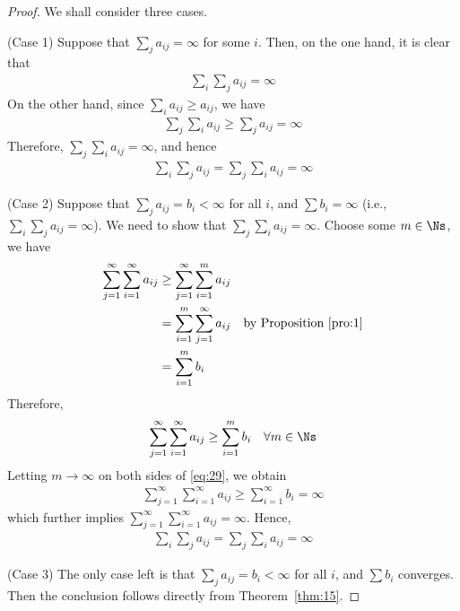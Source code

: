\documentclass[thmcnt=section, 12pt]{elegantbook}
\begin{document}
\begin{proof}
    We shall consider three cases.

    \par (Case 1) Suppose that $\sum_{j} a_{ij} = \infty$ for some $i$. Then, on the one hand, it is clear that 
    \begin{align*}
        \sum_{i} \sum_{j} a_{ij} = \infty
    \end{align*}
    On the other hand, since $\sum_{i} a_{ij} \geq a_{ij}$, we have 
    \begin{align*}
        \sum_{j} \sum_{i} a_{ij} 
        \geq \sum_{j} a_{ij} = \infty
    \end{align*}
    Therefore, $\sum_{j} \sum_{i} a_{ij} = \infty$, and hence 
    \begin{align*}
        \sum_{i} \sum_{j} a_{ij} 
        = \sum_{j} \sum_{i} a_{ij}
        = \infty
    \end{align*}

    \par (Case 2) Suppose that $\sum_{j} a_{ij} = b_i < \infty$ for all $i$, and $\sum b_i = \infty$ (i.e., $\sum_i \sum_j a_{ij} = \infty$). We need to show that $\sum_j \sum_i a_{ij} = \infty$. Choose some $m \in \Ns$, we have 
    \begin{align*}
        \sum_{j=1}^\infty \sum_{i=1}^\infty a_{ij}
        &\geq \sum_{j=1}^\infty \sum_{i=1}^m a_{ij} \\ 
        &= \sum_{i=1}^m \sum_{j=1}^\infty a_{ij} 
        \quad \text{by Proposition~\ref{pro:1}} \\
        &= \sum_{i=1}^m b_i
    \end{align*}
    Therefore,
    \begin{align}
        \sum_{j=1}^\infty \sum_{i=1}^\infty a_{ij}
        \geq \sum_{i=1}^m b_i 
        \quad \forall m \in \Ns
        \label{eq:29}
    \end{align}
    Letting $m \to \infty$ on both sides of \eqref{eq:29}, we obtain 
    \begin{align*}
        \sum_{j=1}^\infty \sum_{i=1}^\infty a_{ij}
        \geq \sum_{i=1}^\infty b_i
        = \infty
    \end{align*}
    which further implies $\sum_{j=1}^\infty \sum_{i=1}^\infty a_{ij} = \infty$.
    Hence, 
    \begin{align*}
        \sum_{i} \sum_{j} a_{ij} 
        = \sum_{j} \sum_{i} a_{ij}
        = \infty
    \end{align*}

    \par (Case 3) The only case left is that $\sum_{j} a_{ij} = b_i < \infty$ for all $i$, and $\sum b_i$ converges. Then the conclusion follows directly from Theorem~\ref{thm:15}.
\end{proof}
\end{document}
